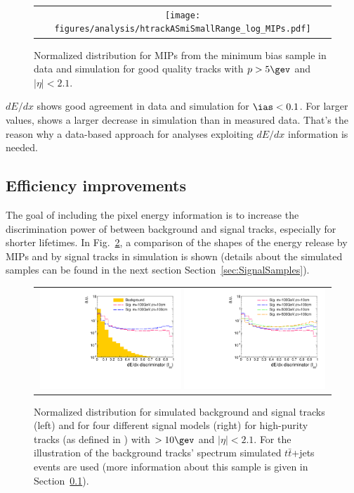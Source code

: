 \begin{figure}[!bt]
  \centering 
  \begin{tabular}{c}
    \texttt{[image: figures/analysis/htrackASmiSmallRange\_log\_MIPs.pdf]}
  \end{tabular}
  \caption{Normalized \ias distribution for MIPs from the minimum bias sample in data and simulation for good quality tracks with $p>5\gev$ and $|\eta|<2.1$.}
  \label{fig:Data-MC-Dedx_MIPs}
\end{figure}
$dE/dx$ shows good agreement in data and simulation for $\ias<0.1$.
For larger values, \ias shows a larger decrease in simulation than in measured data.
That's the reason why a data-based approach for analyses exploiting $dE/dx$ information is needed.\\


\subsection{Efficiency improvements}
The goal of including the pixel energy information is to increase the discrimination power of \ias between background and signal tracks, especially for shorter lifetimes.
In Fig.~\ref{fig:MIPs-Signal-Dedx}, a comparison of the shapes of the energy release by MIPs and by signal tracks in simulation is shown (details about the simulated samples can be found in the next section Section~\ref{sec:SignalSamples}).
\begin{figure}[!bt]
  \centering 
  \begin{tabular}{c}
    \includegraphics[width=0.49\textwidth]{figures/analysis/htrackASmiSmallRangePlusSM_log.pdf}   
    \includegraphics[width=0.49\textwidth]{figures/analysis/htrackASmiSmallRange_4Signals_log.pdf}
  \end{tabular}
  \caption{Normalized \ias distribution for simulated background and signal tracks (left) and for four different signal models (right) 
           for high-purity tracks (as defined in \cite{bib:CMS:Tracking_2010}) with \pt$>10\gev$ and $|\eta|<2.1$.
           For the illustration of the background tracks' spectrum simulated $t\bar{t}$+jets events are used (more information about this sample is given in Section~\ref{}).}
  \label{fig:MIPs-Signal-Dedx}
\end{figure} 
